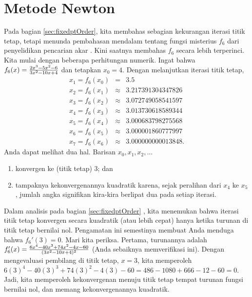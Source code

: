 
\section{\label{sec:newtonsMethod}Metode Newton}

Pada bagian \ref{sec:fixedptOrder}, kita membahas sebagian kekurangan
iterasi titik tetap, tetapi menunda pembahasan mendalam tentang fungsi
misterius $f_{6}$ dari penyelidikan pencarian akar .
Kini saatnya membahas $f_{6}$ secara lebih terperinci. Kita mulai
dengan beberapa perhitungan numerik. Ingat bahwa $f_{6}(x)=\frac{2x^{3}\text{\textminus}5x^{2}\text{\textminus}6}{3x^{2}\text{\textminus}10x+4}$
dan tetapkan $x_{0}=4.$ Dengan melanjutkan iterasi titik tetap,
\begin{eqnarray*}
x_{1}=f_{6}(x_{0}) & = & 3.5\\
x_{2}=f_{6}(x_{1}) & \approx & 3.217391304347826\\
x_{3}=f_{6}(x_{2}) & \approx & 3.072749058541597\\
x_{4}=f_{6}(x_{3}) & \approx & 3.013730618589344\\
x_{5}=f_{6}(x_{4}) & \approx & 3.000683798275568\\
x_{6}=f_{6}(x_{5}) & \approx & 3.000001860777997\\
x_{7}=f_{6}(x_{6}) & \approx & 3.000000000013848.
\end{eqnarray*}
Anda dapat melihat dua hal. Barisan $x_{0},x_{1},x_{2},\ldots$
\begin{enumerate}
\item konvergen ke (titik tetap) 3; dan
\item tampaknya kekonvergenannya kuadratik karena, sejak peralihan dari
$x_{4}$ ke $x_{5}$, jumlah angka signifikan kira-kira berlipat dua
pada setiap iterasi.
\end{enumerate}
Dalam analisis pada bagian \ref{sec:fixedptOrder} ,
kita menemukan bahwa iterasi titik tetap konvergen secara kuadratik
(atau lebih cepat) hanya ketika turunan di titik tetap bernilai nol.
Pengamatan ini semestinya membuat Anda menduga bahwa $f_{6}'(3)=0$.
Mari kita periksa. Pertama, turunannya adalah $f_{6}'(x)=\frac{6x^{4}\text{\textminus}40x^{3}+74x^{2}\text{\textminus}4x\text{\textminus}60}{(3x^{2}\text{\textminus}10x+4)^{2}}$
(Anda sebaiknya memverifikasi ini). Dengan mengevaluasi pembilang
di titik tetap, $x=3$, kita memperoleh $6(3)^{4}-40(3)^{3}+74(3)^{2}-4(3)-60=486-1080+666-12-60=0$.
Jadi, kita memperoleh kekonvergenan menuju titik tetap tempat turunan
fungsi bernilai nol, dan memang kekonvergenannya kuadratik.

